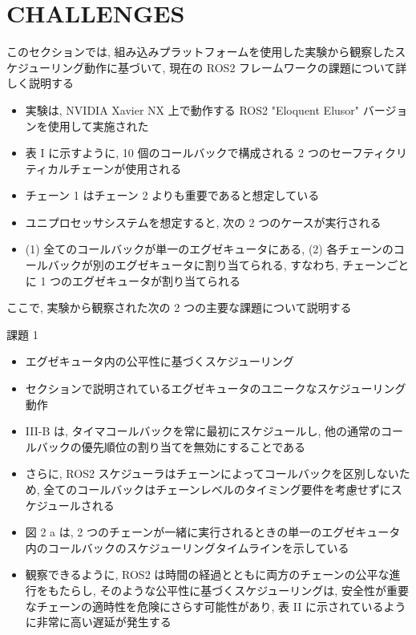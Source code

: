 
\section{CHALLENGES}
\label{sec: challenges}

\begin{frame}{}
    このセクションでは, 組み込みプラットフォームを使用した実験から観察したスケジューリング動作に基づいて, 現在の ROS2 フレームワークの課題について詳しく説明する
\end{frame}

\begin{frame}{}
    \begin{itemize}
        \item 実験は, NVIDIA Xavier NX 上で動作する ROS2 "Eloquent Elusor" バージョンを使用して実施された
\item 表 I に示すように, 10 個のコールバックで構成される 2 つのセーフティクリティカルチェーンが使用される
\item チェーン 1 はチェーン 2 よりも重要であると想定している
\item ユニプロセッサシステムを想定すると, 次の 2 つのケースが実行される
\item (1) 全てのコールバックが単一のエグゼキュータにある, (2) 各チェーンのコールバックが別のエグゼキュータに割り当てられる, すなわち, チェーンごとに 1 つのエグゼキュータが割り当てられる
    \end{itemize}
\end{frame}

\begin{frame}{}
    ここで, 実験から観察された次の 2 つの主要な課題について説明する

\end{frame}

\begin{frame}{課題 1}
    \begin{itemize}
        \item エグゼキュータ内の公平性に基づくスケジューリング
\item セクションで説明されているエグゼキュータのユニークなスケジューリング動作
\item III-B は, タイマコールバックを常に最初にスケジュールし, 他の通常のコールバックの優先順位の割り当てを無効にすることである
\item さらに, ROS2 スケジューラはチェーンによってコールバックを区別しないため, 全てのコールバックはチェーンレベルのタイミング要件を考慮せずにスケジュールされる
\item 図 2 a は, 2 つのチェーンが一緒に実行されるときの単一のエグゼキュータ内のコールバックのスケジューリングタイムラインを示している
\item 観察できるように, ROS2 は時間の経過とともに両方のチェーンの公平な進行をもたらし, そのような公平性に基づくスケジューリングは, 安全性が重要なチェーンの適時性を危険にさらす可能性があり, 表 II に示されているように非常に高い遅延が発生する
    \end{itemize}
\end{frame}

